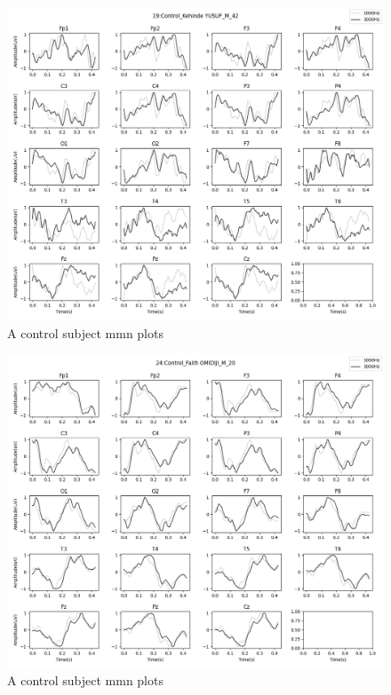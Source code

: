 \documentclass[10pt]{article}
\begin{document}
\begin{figure}[H]
  \includegraphics[width=16cm]{../../../data_analysis_results/MMN/time_series/Control/19.png}
  \caption{A control subject \gls{mmn} plots}
\end{figure}
\begin{figure}[H]
  \includegraphics[width=16cm]{../../../data_analysis_results/MMN/time_series/Control/24.png}
  \caption{A control subject \gls{mmn} plots}
\end{figure}
\end{document}
